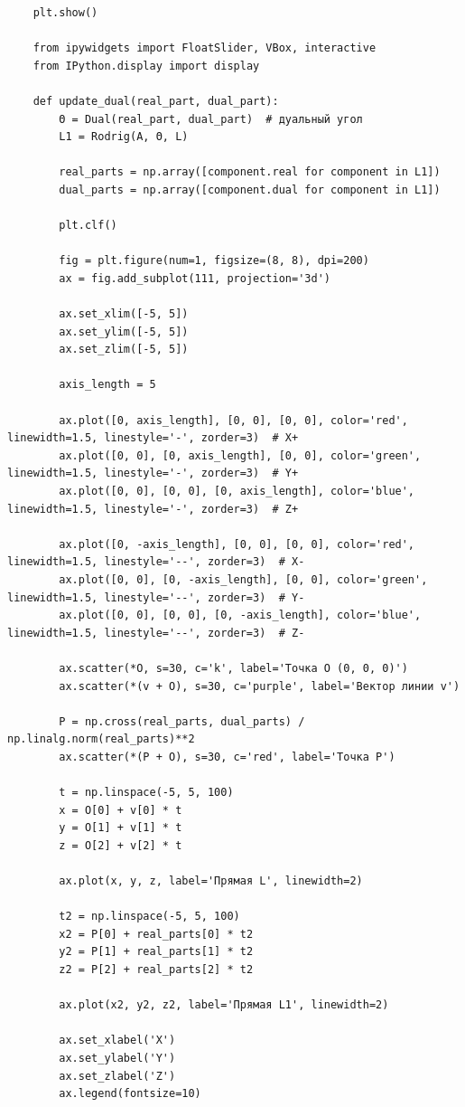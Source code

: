 \begin{verbatim}
    plt.show()

    from ipywidgets import FloatSlider, VBox, interactive
    from IPython.display import display

    def update_dual(real_part, dual_part):
        Θ = Dual(real_part, dual_part)  # дуальный угол
        L1 = Rodrig(A, Θ, L)

        real_parts = np.array([component.real for component in L1])
        dual_parts = np.array([component.dual for component in L1])

        plt.clf()

        fig = plt.figure(num=1, figsize=(8, 8), dpi=200)
        ax = fig.add_subplot(111, projection='3d')

        ax.set_xlim([-5, 5])
        ax.set_ylim([-5, 5])
        ax.set_zlim([-5, 5])

        axis_length = 5

        ax.plot([0, axis_length], [0, 0], [0, 0], color='red', linewidth=1.5, linestyle='-', zorder=3)  # X+
        ax.plot([0, 0], [0, axis_length], [0, 0], color='green', linewidth=1.5, linestyle='-', zorder=3)  # Y+
        ax.plot([0, 0], [0, 0], [0, axis_length], color='blue', linewidth=1.5, linestyle='-', zorder=3)  # Z+

        ax.plot([0, -axis_length], [0, 0], [0, 0], color='red', linewidth=1.5, linestyle='--', zorder=3)  # X-
        ax.plot([0, 0], [0, -axis_length], [0, 0], color='green', linewidth=1.5, linestyle='--', zorder=3)  # Y-
        ax.plot([0, 0], [0, 0], [0, -axis_length], color='blue', linewidth=1.5, linestyle='--', zorder=3)  # Z-

        ax.scatter(*O, s=30, c='k', label='Точка O (0, 0, 0)')
        ax.scatter(*(v + O), s=30, c='purple', label='Вектор линии v')

        P = np.cross(real_parts, dual_parts) / np.linalg.norm(real_parts)**2
        ax.scatter(*(P + O), s=30, c='red', label='Точка P')

        t = np.linspace(-5, 5, 100)
        x = O[0] + v[0] * t
        y = O[1] + v[1] * t
        z = O[2] + v[2] * t

        ax.plot(x, y, z, label='Прямая L', linewidth=2)

        t2 = np.linspace(-5, 5, 100)
        x2 = P[0] + real_parts[0] * t2
        y2 = P[1] + real_parts[1] * t2
        z2 = P[2] + real_parts[2] * t2

        ax.plot(x2, y2, z2, label='Прямая L1', linewidth=2)

        ax.set_xlabel('X')
        ax.set_ylabel('Y')
        ax.set_zlabel('Z')
        ax.legend(fontsize=10)


\end{verbatim}
